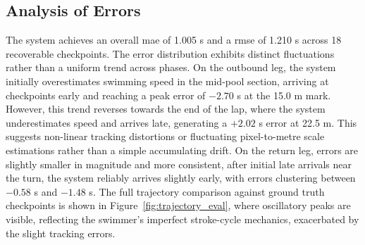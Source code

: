 \subsection{Analysis of Errors}
The system achieves an overall \gls{mae} of 1.005 s and a \gls{rmse} of 1.210 s across 18 recoverable checkpoints. The error distribution exhibits distinct fluctuations rather than a uniform trend across phases. On the outbound leg, the system initially overestimates swimming speed in the mid-pool section, arriving at checkpoints early and reaching a peak error of $-2.70$ s at the 15.0 m mark. However, this trend reverses towards the end of the lap, where the system underestimates speed and arrives late, generating a $+2.02$ s error at 22.5 m. This suggests non-linear tracking distortions or fluctuating pixel-to-metre scale estimations rather than a simple accumulating drift. On the return leg, errors are slightly smaller in magnitude and more consistent, after initial late arrivals near the turn, the system reliably arrives slightly early, with errors clustering between $-0.58$ s and $-1.48$ s. The full trajectory comparison against ground truth checkpoints is shown in Figure~\ref{fig:trajectory_eval}, where oscillatory peaks are visible, reflecting the swimmer's imperfect stroke-cycle mechanics, exacerbated by the slight tracking errors.



